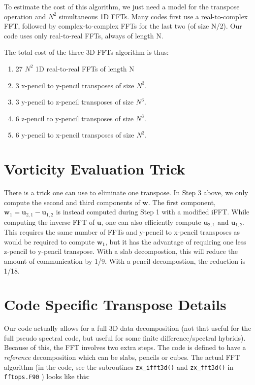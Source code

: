\documentclass[12pt]{article}
\newcommand{\uv}{\mathbf u}
\newcommand{\vor}{\mathbf w}
\begin{document}
To estimate the cost of this algorithm, we just need a model for the
transpose operation and $N^2$ simultaneous 1D FFTs.  
Many codes first use a real-to-complex FFT, followed by
complex-to-complex FFTs for the last two (of size N/2).  
Our code uses only real-to-real FFTs, always of length N.

The total cost of the three 3D FFTs algorithm is thus:
\begin{enumerate}
\item 27 $N^2$ 1D real-to-real FFTs of length N
\item 3 x-pencil to y-pencil transposes of size $N^3$.  
\item 3 y-pencil to z-pencil transposes of size $N^3$.  
\item 6 z-pencil to y-pencil transposes of size $N^3$.  
\item 6 y-pencil to x-pencil transposes of size $N^3$.  
\end{enumerate}


\section{Vorticity Evaluation Trick}


There is a trick one can use to eliminate one transpose.
In Step 3 above, we only compute the second and third components
of $\vor$.  The first component, $\vor_1 = \uv_{2,1} - \uv_{1,2}$ is
instead computed during Step 1 with a modified iFFT.  While
computing the inverse FFT of $\uv$, one can also efficiently compute 
$\uv_{2,1}$ and $\uv_{1,2}$.  This requires the same number of FFTs and
y-pencil to x-pencil transposes as would be required to compute $\vor_1$,
but it has the advantage of requiring one less z-pencil to y-pencil
transpose.  With a slab decompostion, this will reduce the amount
of communication by 1/9. With a pencil decompostion, the reduction
is 1/18.  



\section{Code Specific Transpose Details}
Our code actually allows for a full 3D data decomposition
(not that useful for the full pseudo spectral code, but useful
for some finite difference/spectral hybrids).  Because of this,
the FFT involves two extra steps.  The code
is defined to have a {\em reference} decomposition which
can be slabs, pencils or cubes.  The actual FFT algorithm
(in the code, see the subroutines 
\texttt{zx\_ifft3d()} and \texttt{zx\_fft3d()} in \texttt{fftops.F90} ) 
looks like this:
\end{document}
